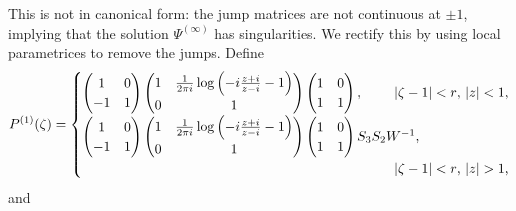\documentclass[11pt,fleqn]{article}
\numberwithin{equation}{section}
\begin{document}
This is not in canonical form: the jump matrices are not continuous at $\pm 1$, implying that the solution $\Psi^{(\infty)}$ has singularities.  We rectify this by using local parametrices to remove the jumps.  Define
\begin{equation*}
    P^{(1)}(\zeta)  =\begin{cases}
        \begin{pmatrix}
        1  &0\\
            -1 & 1
        \end{pmatrix}
        \begin{pmatrix}
        1 & {1 \over 2 \pi i} \log\left(-i { z + i \over z - i} - 1\right) \\
           0 & 1
        \end{pmatrix}
        \begin{pmatrix}
        1 &0 \\
            1 & 1
        \end{pmatrix},&\hspace{-1cm}\mbox{$|\zeta-1|<r$, $|z|<1$,}
    \\
 \begin{pmatrix}
        1  &0\\
            -1 & 1
    \end{pmatrix}
     \begin{pmatrix}
        1 & {1 \over 2 \pi i} \log\left(-i { z + i \over z - i} - 1\right) \\
           0 & 1
    \end{pmatrix}
     \begin{pmatrix}
        1 &0 \\
            1 & 1
    \end{pmatrix}S_3S_2W^{-1},\\&\hspace{-1cm}\mbox{$|\zeta-1|<r$, $|z|>1$,}
    \end{cases}
    \end{equation*}
    and
\end{document}

